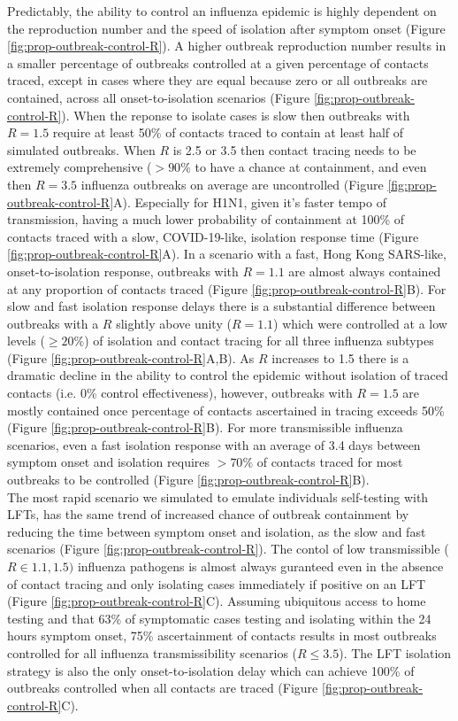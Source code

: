 \documentclass{article}
\begin{document}
Predictably, the ability to control an influenza epidemic is highly dependent on the reproduction number and the speed of isolation after symptom onset (Figure \ref{fig:prop-outbreak-control-R}). A higher outbreak reproduction number results in a smaller percentage of outbreaks controlled at a given percentage of contacts traced, except in cases where they are equal because zero or all outbreaks are contained, across all onset-to-isolation scenarios (Figure \ref{fig:prop-outbreak-control-R}). When the reponse to isolate cases is slow then outbreaks with $R = 1.5$ require at least 50\% of contacts traced to contain at least half of simulated outbreaks. When $R$ is 2.5 or 3.5 then contact tracing needs to be extremely comprehensive ($>90\%$ to have a chance at containment, and even then $R = 3.5$ influenza outbreaks on average are uncontrolled (Figure \ref{fig:prop-outbreak-control-R}A). Especially for H1N1, given it's faster tempo of transmission, having a much lower probability of containment at 100\% of contacts traced with a slow, COVID-19-like, isolation response time (Figure \ref{fig:prop-outbreak-control-R}A). In a scenario with a fast, Hong Kong SARS-like, onset-to-isolation response, outbreaks with $R = 1.1$ are almost always contained at any proportion of contacts traced (Figure \ref{fig:prop-outbreak-control-R}B). For slow and fast isolation response delays there is a substantial difference between outbreaks with a $R$ slightly above unity ($R = 1.1$) which were controlled at a low levels ($\geq 20\%$) of isolation and contact tracing for all three influenza subtypes (Figure \ref{fig:prop-outbreak-control-R}A,B). As $R$ increases to 1.5 there is a dramatic decline in the ability to control the epidemic without isolation of traced contacts (i.e. 0\% control effectiveness), however, outbreaks with $R = 1.5$ are mostly contained once percentage of contacts ascertained in tracing exceeds 50\% (Figure \ref{fig:prop-outbreak-control-R}B). For more transmissible influenza scenarios, even a fast isolation response with an average of 3.4 days between symptom onset and isolation requires $>70\%$ of contacts traced for most outbreaks to be controlled (Figure \ref{fig:prop-outbreak-control-R}B). \\

The most rapid scenario we simulated to emulate individuals self-testing with LFTs, has the same trend of increased chance of outbreak containment by reducing the time between symptom onset and isolation, as the slow and fast scenarios (Figure \ref{fig:prop-outbreak-control-R}). The contol of low transmissible ($R \in {1.1, 1.5})$ influenza pathogens is almost always guranteed even in the absence of contact tracing and only isolating cases immediately if positive on an LFT (Figure \ref{fig:prop-outbreak-control-R}C). Assuming ubiquitous access to home testing and that 63\% of symptomatic cases testing and isolating within the 24 hours symptom onset, 75\% ascertainment of contacts results in most outbreaks controlled for all influenza transmissibility scenarios ($R \leq 3.5$). The LFT isolation strategy is also the only onset-to-isolation delay which can achieve 100\% of outbreaks controlled when all contacts are traced (Figure \ref{fig:prop-outbreak-control-R}C). \\
\end{document}
